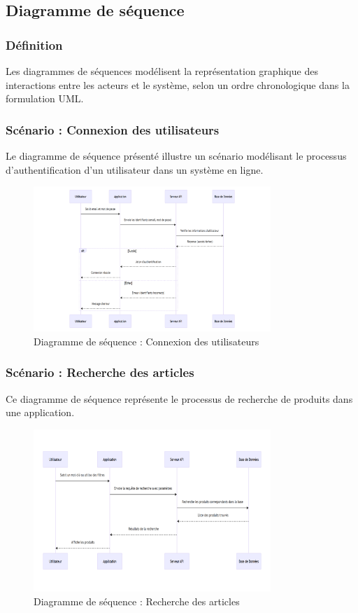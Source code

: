 \documentclass[12pt,a4paper]{report}
\begin{document}
	\subsection{Diagramme de séquence}
	\subsubsection{Définition}
	Les diagrammes de séquences modélisent la représentation graphique des interactions entre les acteurs et le système, selon un ordre chronologique dans la formulation UML.
	
	\subsubsection{Scénario : Connexion des utilisateurs}
	Le diagramme de séquence présenté illustre un scénario modélisant le processus d'authentification d'un utilisateur dans un système en ligne.
	
	\begin{figure}[H]
		\centering
		\includegraphics[width=0.8\textwidth]{images/authentification_scenario.png}
		\caption{Diagramme de séquence : Connexion des utilisateurs}
		\label{fig:sequence_connexion}
	\end{figure}
	
	\subsubsection{Scénario : Recherche des articles}
	Ce diagramme de séquence représente le processus de recherche de produits dans une application.
	
	\begin{figure}[H]
		\centering
		\includegraphics[width=0.8\textwidth]{images/recherche_scenario.png}
		\caption{Diagramme de séquence : Recherche des articles}
		\label{fig:sequence_recherche}
	\end{figure}
	
\end{document}
